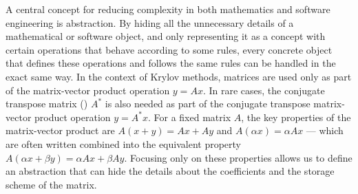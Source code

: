 A central concept for reducing complexity in both mathematics and software
engineering is abstraction. By hiding all the unnecessary details of a
mathematical or software object, and only representing it as a concept with
certain operations that behave according to some rules, every concrete object
that defines these operations and follows the same rules can be
handled in the exact same way. In the context of Krylov methods, matrices are
used only as part of the matrix-vector product operation $y = Ax$. In rare
cases, the conjugate transpose matrix () $A^*$ is also
needed as part of the conjugate transpose matrix-vector product operation $y =
A^*x$. For a fixed matrix $A$, the key properties of the matrix-vector product
are  $A(x+y) = Ax + Ay$ and 
$A(\alpha x) = \alpha Ax$ --- which are often written combined into the
equivalent  property $A(\alpha x + \beta y) = \alpha Ax +
\beta Ay$.
Focusing only on these properties allows us to define an abstraction that can
hide the details about the coefficients and the storage scheme of the matrix.

